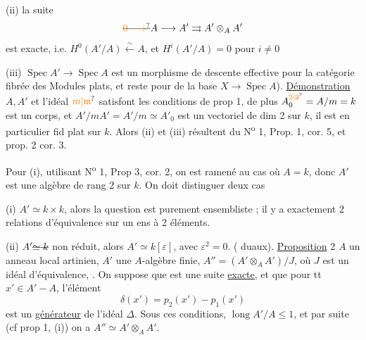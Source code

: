 (ii) la suite
\[
\deleted{\unsure{0\longrightarrow}}A\longrightarrow A'\rightrightarrows A'\otimes_A A'
\]
est exacte,  i.e. $H^0(A'/A)\xleftarrow{\sim}A$, et $H^i(A'/A)=0$ pour $i\ne0$

(iii) $\operatorname{Spec}A'\longrightarrow\operatorname{Spec}A$ est un morphisme de descente effective pour la catégorie fibrée des Modules  plats, et reste  pour   de la base $X\longrightarrow\operatorname{Spec}A$).
\uline{Démonstration} \quad $A,A'$ et l'idéal $\unsure{m|\mathfrak m}$ satisfont les conditions de prop 1, de plus $A_0^{\unsure{2|\deleted{2}}}=A/m=k$ est un corps, et $A'/mA'=A'/m\simeq A'_0$ est un vectoriel de dim 2 sur $k$, il est en particulier fid plat sur $k$. Alors (ii) et (iii) résultent du N\textsuperscript{o} 1, Prop. 1, cor. 5, et prop. 2  cor. 3.

Pour (i), utilisant N\textsuperscript{o} 1, Prop 3, cor. 2, on est ramené au cas où $A=k$, donc $A'$ est une algèbre de rang 2 sur $k$.  On doit distinguer deux cas

(i)  $A'\simeq k\times k$, alors la question est purement ensembliste ; il y a exactement 2 relations d'équivalence sur un ens à 2 éléments.

(ii) $A'\deleted{\simeq k}$ non réduit, alors $A'\simeq k[\varepsilon]$, avec $\varepsilon^2=0$. ( duaux).
\uline{Proposition} 2 \quad {} $A$ un anneau local artinien, $A'$ une $A$-algèbre finie, $A''=(A'\otimes_A A')/J$, où $J$ est un idéal d'équivalence,  . On suppose que 
est une suite \uline{exacte}, et que pour tt $x'\in A'\mathbin{-}A$, l'élément
\[
\delta(x')=p_2(x')-p_1(x')
\]
est un \uline{générateur} de l'idéal $\Delta$.
Sous ces conditions, $\operatorname{long} A'/A\leq1$, et par suite (cf prop 1, (i)) on a $A''\simeq A'\otimes_A A'$.

